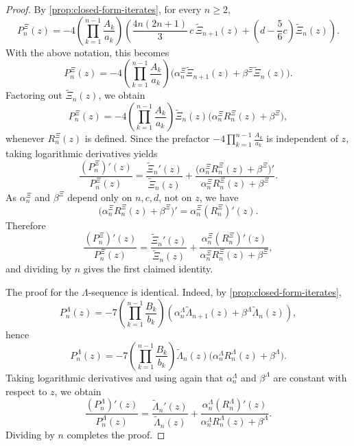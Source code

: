 \documentclass[11pt,twoside]{article}
\numberwithin{equation}{section}
\begin{document}
\begin{proof}
By \cref{prop:closed-form-iterates}, for every \(n\ge 2\),
\[
P_n^\Xi(z)
=
-4\left(\prod_{k=1}^{n-1}\frac{A_k}{a_k}\right)
\left(
\frac{4n(2n+1)}{3}\,c\,\widetilde{\Xi}_{n+1}(z)
+
\left(d-\frac56c\right)\widetilde{\Xi}_n(z)
\right).
\]
With the above notation, this becomes
\[
P_n^\Xi(z)
=
-4\left(\prod_{k=1}^{n-1}\frac{A_k}{a_k}\right)
\bigl(
\alpha_n^\Xi \widetilde{\Xi}_{n+1}(z)+\beta^\Xi \widetilde{\Xi}_n(z)
\bigr).
\]
Factoring out \(\widetilde{\Xi}_n(z)\), we obtain
\[
P_n^\Xi(z)
=
-4\left(\prod_{k=1}^{n-1}\frac{A_k}{a_k}\right)
\widetilde{\Xi}_n(z)\bigl(\alpha_n^\Xi R_n^\Xi(z)+\beta^\Xi\bigr),
\]
whenever \(R_n^\Xi(z)\) is defined. Since the prefactor \(\displaystyle -4\prod_{k=1}^{n-1}\frac{A_k}{a_k}\) is independent of \(z\), taking logarithmic derivatives yields
\[
\frac{(P_n^\Xi)'(z)}{P_n^\Xi(z)}
=
\frac{\widetilde{\Xi}_n'(z)}{\widetilde{\Xi}_n(z)}
+
\frac{\bigl(\alpha_n^\Xi R_n^\Xi(z)+\beta^\Xi\bigr)'}
{\alpha_n^\Xi R_n^\Xi(z)+\beta^\Xi}.
\]
As \(\alpha_n^\Xi\) and \(\beta^\Xi\) depend only on \(n,c,d\), not on \(z\), we have
\[
\bigl(\alpha_n^\Xi R_n^\Xi(z)+\beta^\Xi\bigr)'
=
\alpha_n^\Xi (R_n^\Xi)'(z).
\]
Therefore
\[
\frac{(P_n^\Xi)'(z)}{P_n^\Xi(z)}
=
\frac{\widetilde{\Xi}_n'(z)}{\widetilde{\Xi}_n(z)}
+
\frac{\alpha_n^\Xi (R_n^\Xi)'(z)}
{\alpha_n^\Xi R_n^\Xi(z)+\beta^\Xi},
\]
and dividing by \(n\) gives the first claimed identity.

The proof for the \(\Lambda\)-sequence is identical. Indeed, by \cref{prop:closed-form-iterates},
\[
P_n^\Lambda(z)
=
-7\left(\prod_{k=1}^{n-1}\frac{B_k}{b_k}\right)
\left(
\alpha_n^\Lambda \widetilde{\Lambda}_{n+1}(z)
+
\beta^\Lambda \widetilde{\Lambda}_n(z)
\right),
\]
hence
\[
P_n^\Lambda(z)
=
-7\left(\prod_{k=1}^{n-1}\frac{B_k}{b_k}\right)
\widetilde{\Lambda}_n(z)\bigl(\alpha_n^\Lambda R_n^\Lambda(z)+\beta^\Lambda\bigr).
\]
Taking logarithmic derivatives and using again that \(\alpha_n^\Lambda\) and \(\beta^\Lambda\) are constant with respect to \(z\), we obtain
\[
\frac{(P_n^\Lambda)'(z)}{P_n^\Lambda(z)}
=
\frac{\widetilde{\Lambda}_n'(z)}{\widetilde{\Lambda}_n(z)}
+
\frac{\alpha_n^\Lambda (R_n^\Lambda)'(z)}
{\alpha_n^\Lambda R_n^\Lambda(z)+\beta^\Lambda}.
\]
Dividing by \(n\) completes the proof.
\end{proof}
\end{document}
